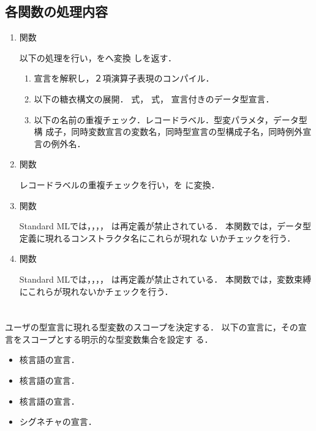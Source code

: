 \subsection{各関数の処理内容}
\begin{enumerate}
\item {}関数

以下の処理を行い，をへ変換
しを返す．
\begin{enumerate}
\item {}宣言を解釈し，２項演算子表現のコンパイル．
\item 以下の糖衣構文の展開．
式，
式，
宣言付きのデータ型宣言．
\item 以下の名前の重複チェック．レコードラベル．型変パラメタ，データ型構
成子，同時変数宣言の変数名，同時型宣言の型構成子名，同時例外宣言の例外名．
\end{enumerate}
	
\item {}関数

レコードラベルの重複チェックを行い，を
に変換．

\item {}関数

	Standard MLでは，，，，
は再定義が禁止されている．
	本関数では，データ型定義に現れるコンストラクタ名にこれらが現れな
いかチェックを行う．
\item {}関数

	Standard MLでは，，，，
は再定義が禁止されている．
	本関数では，変数束縛にこれらが現れないかチェックを行う．
\end{enumerate}

\else%
\fi%

\section{}
\ifjp%
	ユーザの型宣言に現れる型変数のスコープを決定する．
	以下の宣言に，その宣言をスコープとする明示的な型変数集合を設定す
る．
\begin{itemize}
\item 核言語の宣言．
\item 核言語の宣言．
\item 核言語の宣言．
\item シグネチャの宣言．
\end{itemize}

